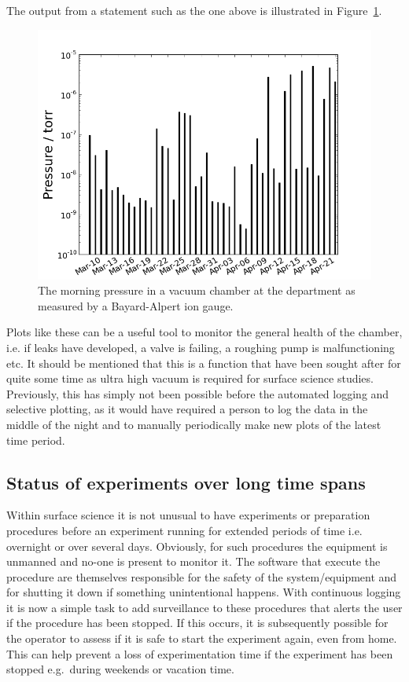 The output from a statement such as the one above is illustrated in
Figure~\ref{fig:morning_pressure}.
\begin{figure}
 \begin{center} 
  \includegraphics[width=12cm]{morning_pressure.png} 

\caption{The morning pressure in a vacuum chamber at the department as measured
 by a Bayard-Alpert ion gauge.\label{fig:morning_pressure}} 
\end{center}
\end{figure} 
Plots like these can be a useful tool to monitor the general health of the
chamber, i.e. if leaks have developed, a valve is failing, a roughing pump is
malfunctioning etc. It should be mentioned that this is a function that have
been sought after for quite some time as ultra high vacuum is required for
surface science studies. Previously, this has simply not been possible before
the automated logging and selective plotting, as it would have required a
person to log the data in the middle of the night and to manually periodically
make new plots of the latest time period.

\subsection{Status of experiments over long time spans} 
Within surface science it is not unusual to have experiments or preparation
procedures before an experiment running for extended periods of time i.e.
overnight or over several days. Obviously, for such procedures the equipment is
unmanned and no-one is present to monitor it. The software that execute the
procedure are themselves responsible for the safety of the system/equipment and
for shutting it down if something unintentional happens. With continuous
logging it is now a simple task to add surveillance to these procedures that
alerts the user if the procedure has been stopped. If this occurs, it is
subsequently possible for the operator to assess if it is safe to start the
experiment again, even from home. This can help prevent a loss of
experimentation time if the experiment has been stopped e.g.\ during weekends
or vacation time.

